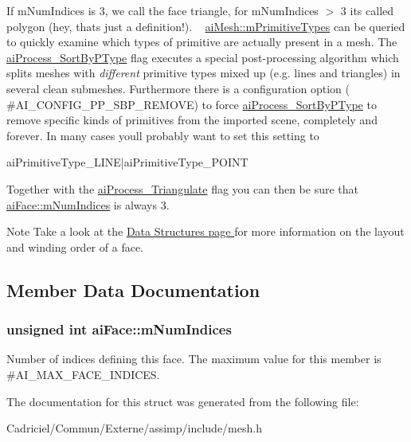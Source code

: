 If m\+Num\+Indices is 3, we call the face \textquotesingle{}triangle\textquotesingle{}, for m\+Num\+Indices $>$ 3 it\textquotesingle{}s called \textquotesingle{}polygon\textquotesingle{} (hey, that\textquotesingle{}s just a definition!). ~\newline
 \hyperlink{structai_mesh_a99d66ac0a444068c1b252b30265cbf53}{ai\+Mesh\+::m\+Primitive\+Types} can be queried to quickly examine which types of primitive are actually present in a mesh. The \hyperlink{postprocess_8h_a64795260b95f5a4b3f3dc1be4f52e410ab4484f73635d633cd79973bac1431ed6}{ai\+Process\+\_\+\+Sort\+By\+P\+Type} flag executes a special post-\/processing algorithm which splits meshes with {\itshape different} primitive types mixed up (e.\+g. lines and triangles) in several \textquotesingle{}clean\textquotesingle{} submeshes. Furthermore there is a configuration option ( \#\+A\+I\+\_\+\+C\+O\+N\+F\+I\+G\+\_\+\+P\+P\+\_\+\+S\+B\+P\+\_\+\+R\+E\+M\+O\+VE) to force \hyperlink{postprocess_8h_a64795260b95f5a4b3f3dc1be4f52e410ab4484f73635d633cd79973bac1431ed6}{ai\+Process\+\_\+\+Sort\+By\+P\+Type} to remove specific kinds of primitives from the imported scene, completely and forever. In many cases you\textquotesingle{}ll probably want to set this setting to 
\begin{DoxyCode}
aiPrimitiveType\_LINE|aiPrimitiveType\_POINT
\end{DoxyCode}
 Together with the \hyperlink{postprocess_8h_a64795260b95f5a4b3f3dc1be4f52e410a9c3de834f0307f31fa2b1b6d05dd592b}{ai\+Process\+\_\+\+Triangulate} flag you can then be sure that \hyperlink{structai_face_adda2698cec0ebfe651572f4a5701360b}{ai\+Face\+::m\+Num\+Indices} is always 3. \begin{DoxyNote}{Note}
Take a look at the \hyperlink{}{Data Structures page } for more information on the layout and winding order of a face. 
\end{DoxyNote}


\subsection{Member Data Documentation}
\subsubsection[{\texorpdfstring{m\+Num\+Indices}{mNumIndices}}]{\setlength{\rightskip}{0pt plus 5cm}unsigned int ai\+Face\+::m\+Num\+Indices}\hypertarget{structai_face_adda2698cec0ebfe651572f4a5701360b}{}\label{structai_face_adda2698cec0ebfe651572f4a5701360b}
Number of indices defining this face. The maximum value for this member is \#\+A\+I\+\_\+\+M\+A\+X\+\_\+\+F\+A\+C\+E\+\_\+\+I\+N\+D\+I\+C\+ES. 

The documentation for this struct was generated from the following file\+:\begin{DoxyCompactItemize}
\item 
Cadriciel/\+Commun/\+Externe/assimp/include/mesh.\+h\end{DoxyCompactItemize}
